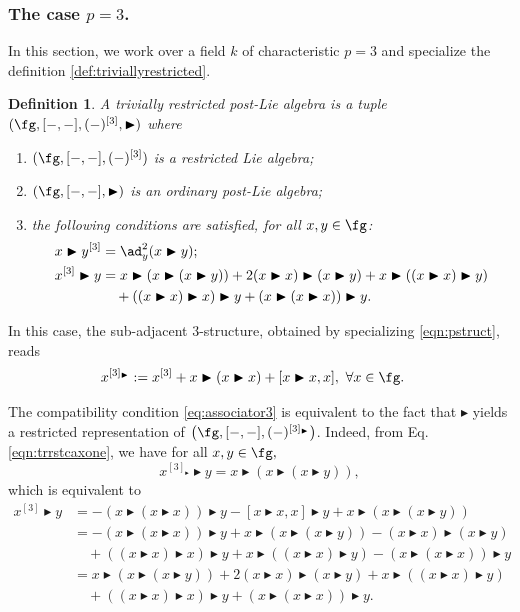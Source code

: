 \documentclass[12pt]{article}
\newcommand{\btr}{\blacktriangleright}
\newtheorem{definition}[theorem]{Definition}
\begin{document}
 \subsubsection{The case $p=3$.}\label{sec:p=3}
In this section, we work over a field $k$ of characteristic $p=3$ and specialize the definition \ref{def:triviallyrestricted}.
\begin{definition}\label{def:restrictedpostlie3} 
A trivially restricted post-Lie algebra is a tuple $(\fg,[-,-],(-)^{[3]},\btr)$ where
\begin{enumerate}
    \item $(\fg,[-,-],(-)^{[3]})$ is a restricted Lie algebra;
    \item $(\fg,[-,-],\btr)$ is an ordinary post-Lie algebra;
    \item the following conditions are satisfied, for all $x,y\in \fg$:
    \begin{align}
        x\btr y^{[3]}&=\ad_y^2(x\btr y);\label{eq:restderivation3}\\
        x^{[3]}\btr y&=x\btr(x\btr(x\btr y))+2(x\btr x)\btr(x\btr y)+x\btr((x\btr x)\btr y)\label{eq:associator3}\\\nonumber
        &\quad+((x\btr x)\btr x)\btr y+(x\btr(x\btr x) )\btr y.
    \end{align}
\end{enumerate}
\end{definition}
In this case, the sub-adjacent $3$-structure, obtained by specializing \eqref{eqn:pstruct}, reads
\begin{align}
        x^{[3]_{\btr}}&:=x^{[3]}+x\btr(x\btr x)+[x\btr x,x],~\forall x\in \fg.
    \end{align} 

The compatibility condition \eqref{eq:associator3} is equivalent to the fact that $\btr$ yields a restricted representation of $\bigl(\fg,[-,-],(-)^{[3]_{\btr}}\bigl)$. Indeed, from Eq. \eqref{eqn:trrstcaxone}, we have for all $x,y\in\fg,$
$$x^{[3]_{\btr}}\btr y=x\btr (x\btr (x\btr y)), $$ which is equivalent to
\begin{align*}
    x^{[3]}\btr y&=-(x\btr(x\btr x))\btr y-[x\btr x,x]\btr y+x\btr(x\btr(x\btr y))\\
    &=-(x\btr(x\btr x))\btr y+x\btr(x\btr(x\btr y))-(x\btr x)\btr(x\btr y)\\
    &\quad+((x\btr x)\btr x)\btr y+x\btr((x\btr x)\btr y)-(x\btr(x\btr x))\btr y\\
    &=x\btr(x\btr(x\btr y))+2(x\btr x)\btr(x\btr y)+x\btr((x\btr x)\btr y)\\
        &\quad+((x\btr x)\btr x)\btr y+(x\btr(x\btr x) )\btr y.
\end{align*}
\end{document}
